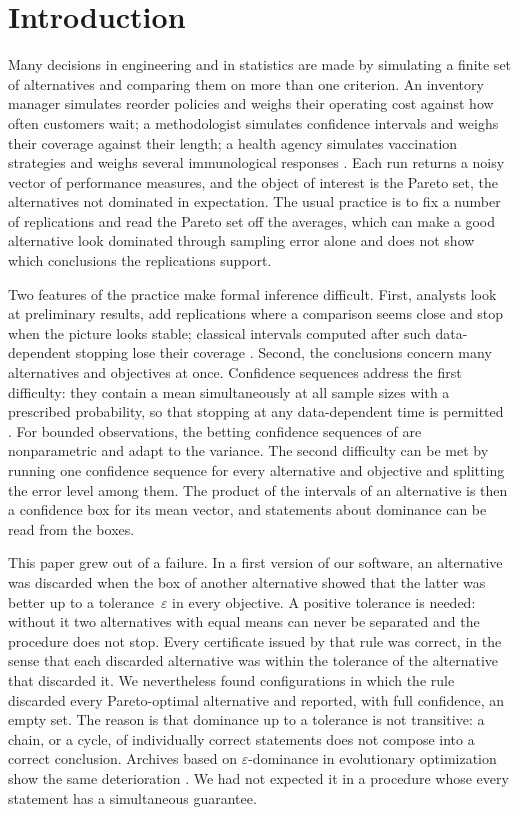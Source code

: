 \section{Introduction}\label{sec:intro}

Many decisions in engineering and in statistics are made by simulating a finite set of alternatives and comparing them on more than one criterion. An inventory manager simulates reorder policies and weighs their operating cost against how often customers wait; a methodologist simulates confidence intervals and weighs their coverage against their length; a health agency simulates vaccination strategies and weighs several immunological responses \citep{kone2023}. Each run returns a noisy vector of performance measures, and the object of interest is the Pareto set, the alternatives not dominated in expectation. The usual practice is to fix a number of replications and read the Pareto set off the averages, which can make a good alternative look dominated through sampling error alone and does not show which conclusions the replications support.

Two features of the practice make formal inference difficult. First, analysts look at preliminary results, add replications where a comparison seems close and stop when the picture looks stable; classical intervals computed after such data-dependent stopping lose their coverage \citep{johari2022,ramdas2023}. Second, the conclusions concern many alternatives and objectives at once. Confidence sequences address the first difficulty: they contain a mean simultaneously at all sample sizes with a prescribed probability, so that stopping at any data-dependent time is permitted \citep{darling1967,howard2021}. For bounded observations, the betting confidence sequences of \citet{waudbysmith2024} are nonparametric and adapt to the variance. The second difficulty can be met by running one confidence sequence for every alternative and objective and splitting the error level among them. The product of the intervals of an alternative is then a confidence box for its mean vector, and statements about dominance can be read from the boxes.

This paper grew out of a failure. In a first version of our software, an alternative was discarded when the box of another alternative showed that the latter was better up to a tolerance~$\varepsilon$ in every objective. A positive tolerance is needed: without it two alternatives with equal means can never be separated and the procedure does not stop. Every certificate issued by that rule was correct, in the sense that each discarded alternative was within the tolerance of the alternative that discarded it. We nevertheless found configurations in which the rule discarded every Pareto-optimal alternative and reported, with full confidence, an empty set. The reason is that dominance up to a tolerance is not transitive: a chain, or a cycle, of individually correct statements does not compose into a correct conclusion. Archives based on $\varepsilon$-dominance in evolutionary optimization show the same deterioration \citep{laumanns2002}. We had not expected it in a procedure whose every statement has a simultaneous guarantee.

